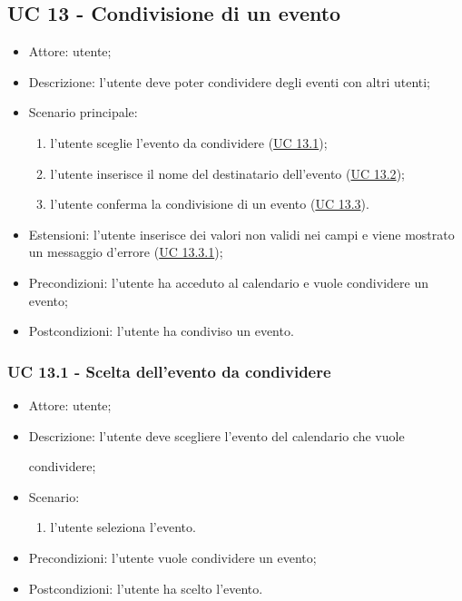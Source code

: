 \subsection{UC 13 - Condivisione di un evento}
\begin{itemize}
    \item Attore: utente;
    \item Descrizione: l'utente deve poter condividere degli eventi con altri utenti;
    \item Scenario principale:
        \begin{enumerate}
        \item l'utente sceglie l'evento da condividere (\hyperref[sec: UC 13.1]{UC 13.1});
        \item l'utente inserisce il nome del destinatario dell'evento (\hyperref[sec: UC 13.2]{UC 13.2});
        \item l'utente conferma la condivisione di un evento (\hyperref[sec: UC 13.3]{UC 13.3}).
        \end{enumerate}
    \item Estensioni: l'utente inserisce dei valori non validi nei campi e viene mostrato un messaggio d'errore (\hyperref[sec: UC 13.3.1]{UC 13.3.1});
    \item Precondizioni: l'utente ha acceduto al calendario e vuole condividere un evento;
    \item Postcondizioni: l'utente ha condiviso un evento.
\end{itemize}

\subsubsection{UC 13.1 - Scelta dell'evento da condividere} \label{sec: UC 13.1}
\begin{itemize}
    \item Attore: utente;
    \item Descrizione: l'utente deve scegliere l'evento del calendario che vuole \par condividere;
    \item Scenario:
        \begin{enumerate}
        \item l'utente seleziona l'evento.
        \end{enumerate}
    
    \item Precondizioni: l'utente vuole condividere un evento;
    \item Postcondizioni: l'utente ha scelto l'evento.
\end{itemize}


